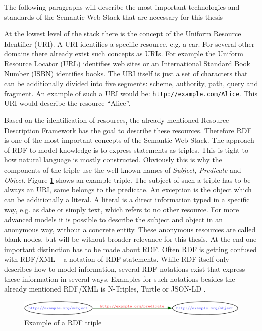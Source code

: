 The following paragraphs will describe the most important technologies and standards of the Semantic Web Stack that are necessary for this thesis

At the lowest level of the stack there is the concept of the Uniform Resource Identifier (URI).
A URI identifies a specific resource, e.g. a car.
For several other domains there already exist such concepts as URIs.
For example the Uniform Resource Locator (URL) identifies web sites or an International Standard Book Number (ISBN) identifies books.
The URI itself is just a set of characters that can be additionally divided into five segments: scheme, authority, path, query and fragment.
An example of such a URI would be: \texttt{http://example.com/Alice}.
This URI would describe the resource ``Alice''.

Based on the identification of resources, the already mentioned Resource Description Framework has the goal to describe these resources.
Therefore RDF is one of the most important concepts of the Semantic Web Stack.
The approach of RDF to model knowledge is to express statements as triples.
This is tight to how natural language is mostly constructed.
Obviously this is why the components of the triple use the well known names of \textit{Subject, Predicate} and \textit{Object}.
Figure \ref{fig:sem_rdf} shows an example triple.
The subject of such a triple has to be always an URI, same belongs to the predicate.
An exception is the object which can be additionally a literal.
A literal is a direct information typed in a specific way, e.g. as date or simply text, which refers to no other resource.
For more advanced models it is possible to describe the subject and object in an anonymous way, without a concrete entity.
These anonymous resources are called blank nodes, but will be without broader relevance for this thesis.
At the end one important distinction has to be made about RDF.
Often RDF is getting confused with RDF/XML \cite{beckett2004rdf} -- a notation of RDF statements.
While RDF itself only describes how to model information, several RDF notations exist that express these information in several ways.
Examples for such notations besides the already mentioned RDF/XML is N-Triples, Turtle \cite{beckett2008turtle} or JSON-LD \cite{lanthaler2012using}.

\begin{figure}
  \centering
  \includegraphics[width=\textwidth]{preliminaries/semweb_rdf1}
  \caption{Example of a RDF triple}
  \label{fig:sem_rdf}
\end{figure}

